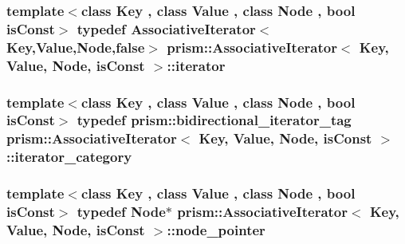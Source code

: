 \subsubsection[{\texorpdfstring{iterator}{iterator}}]{\setlength{\rightskip}{0pt plus 5cm}template$<$class Key , class Value , class Node , bool is\+Const$>$ typedef {\bf Associative\+Iterator}$<$Key,Value,Node,false$>$ {\bf prism\+::\+Associative\+Iterator}$<$ Key, Value, Node, is\+Const $>$\+::{\bf iterator}}\hypertarget{structprism_1_1_associative_iterator_a1c18ef8b4a02324bfdbf541b023ecc6b}{}\label{structprism_1_1_associative_iterator_a1c18ef8b4a02324bfdbf541b023ecc6b}
\subsubsection[{\texorpdfstring{iterator\+\_\+category}{iterator_category}}]{\setlength{\rightskip}{0pt plus 5cm}template$<$class Key , class Value , class Node , bool is\+Const$>$ typedef {\bf prism\+::bidirectional\+\_\+iterator\+\_\+tag} {\bf prism\+::\+Associative\+Iterator}$<$ Key, Value, Node, is\+Const $>$\+::{\bf iterator\+\_\+category}}\hypertarget{structprism_1_1_associative_iterator_ac502de0ddebd90f614e6de73ffbedde7}{}\label{structprism_1_1_associative_iterator_ac502de0ddebd90f614e6de73ffbedde7}
\subsubsection[{\texorpdfstring{node\+\_\+pointer}{node_pointer}}]{\setlength{\rightskip}{0pt plus 5cm}template$<$class Key , class Value , class Node , bool is\+Const$>$ typedef Node$\ast$ {\bf prism\+::\+Associative\+Iterator}$<$ Key, Value, Node, is\+Const $>$\+::{\bf node\+\_\+pointer}}\hypertarget{structprism_1_1_associative_iterator_a73a0ddce41b285bf48fb0ef3411f6557}{}\label{structprism_1_1_associative_iterator_a73a0ddce41b285bf48fb0ef3411f6557}
